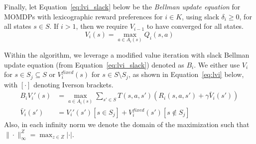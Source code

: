Finally, let Equation~\ref{eq:lvi_slack} below be the \emph{Bellman update equation} for MOMDPs with lexicographic reward preferences for $i \in K$, using slack $\delta_i \geq 0$, for all states $s \in S$. If $i > 1$, then we require $V_{i-1}$ to have converged for all states.
\begin{equation}
    \label{eq:lvi_slack}
    V_i(s) = \max_{a \in A_i(s)} Q_i(s, a)
\end{equation}

Within the algorithm, we leverage a modified value iteration with slack Bellman update equation (from Equation~\ref{eq:lvi_slack}) denoted as $B_i$. We either use $V_i$ for $s \in S_j \subseteq S$ or $V_i^{fixed}(s)$ for $s \in S \setminus S_j$, as shown in Equation~\ref{eq:lvi} below, with $[\cdot]$ denoting Iverson brackets.
\begin{align}
    B_i V_i'(s) &= \max_{a \in A_i(s)} \sum_{s' \in S} T(s, a, s') (R_i(s, a, s') + \gamma \bar{V}_i(s')) \label{eq:lvi} \\
    \bar{V}_i(s') &= V_i'(s') [s \in S_j] + V_i^{fixed}(s') [s \notin S_j] \label{eq:lvi_V_bar}
\end{align}
Also, in each infinity norm we denote the domain of the maximization such that $\| \cdot \|_\infty^Z = \max_{z \in Z} | \cdot |$.

